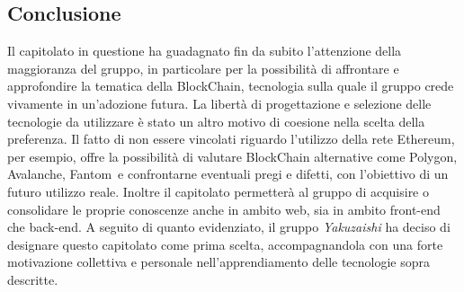 \subsection{Conclusione}
Il capitolato in questione ha guadagnato fin da subito l'attenzione della maggioranza del gruppo, in particolare per la possibilità di affrontare e approfondire la tematica della BlockChain, tecnologia sulla quale il gruppo crede vivamente in un'adozione futura.
La libertà di progettazione e selezione delle tecnologie da utilizzare è stato un altro motivo di coesione nella scelta della preferenza. Il fatto di non essere vincolati riguardo l'utilizzo della rete Ethereum, per esempio, offre la possibilità di valutare BlockChain
alternative come Polygon\glo, Avalanche\glo, Fantom\glo\ e confrontarne eventuali pregi e difetti, con l'obiettivo di un futuro utilizzo reale.
\newline
Inoltre il capitolato permetterà al gruppo di acquisire o consolidare le proprie conoscenze anche in ambito web, sia in ambito front-end che back-end. A seguito di quanto evidenziato, il gruppo \textit{Yakuzaishi} ha deciso di designare questo capitolato come prima scelta,
accompagnandola con una forte motivazione collettiva e personale nell'apprendiamento delle tecnologie sopra descritte.
